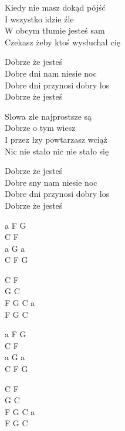 \begin{text}
    Kiedy nie masz dokąd pójść\\
    I wszystko idzie źle\\
    W obcym tłumie jesteś sam\\
    Czekasz żeby ktoś wysłuchał cię

    Dobrze że jesteś\\
    Dobre dni nam niesie noc\\
    Dobre dni przynosi dobry los\\
    Dobrze że jesteś

    Słowa złe najprostsze są\\
    Dobrze o tym wiesz\\
    I przez łzy powtarzasz wciąż\\
    Nic nie stało nic nie stało się

    Dobrze że jesteś\\
    Dobre sny nam niesie noc\\
    Dobre dni przynosi dobry los\\
    Dobrze że jesteś
\end{text}
\begin{chord}
    a F G\\
    C F\\
    a G a\\
    C F G

    C F\\
    G C\\
    F G C a\\
    F G C

    a F G\\
    C F\\
    a G a\\
    C F G

    C F\\
    G C\\
    F G C a\\
    F G C
\end{chord}